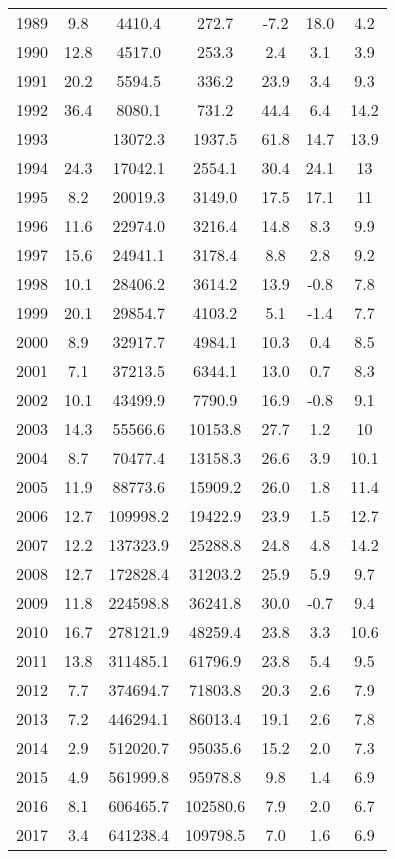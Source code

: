 \begin{table}[t]
\begin{tabularx}{\linewidth}{c S[table-format=2.1] *2{S[table-format=6.1]} *3{S[table-format=2.1]}}
  1989 & 9.8  & 4410.4   & 272.7    & -7.2 & 18.0 & 4.2  \\
  1990 & 12.8 & 4517.0   & 253.3    & 2.4  & 3.1  & 3.9  \\
  1991 & 20.2 & 5594.5   & 336.2    & 23.9 & 3.4  & 9.3  \\
  1992 & 36.4 & 8080.1   & 731.2    & 44.4 & 6.4  & 14.2 \\
  1993 &      & 13072.3  & 1937.5   & 61.8 & 14.7 & 13.9 \\
  1994 & 24.3 & 17042.1  & 2554.1   & 30.4 & 24.1 & 13   \\
  1995 & 8.2  & 20019.3  & 3149.0   & 17.5 & 17.1 & 11   \\
  1996 & 11.6 & 22974.0  & 3216.4   & 14.8 & 8.3  & 9.9  \\
  1997 & 15.6 & 24941.1  & 3178.4   & 8.8  & 2.8  & 9.2  \\
  1998 & 10.1 & 28406.2  & 3614.2   & 13.9 & -0.8 & 7.8  \\
  1999 & 20.1 & 29854.7  & 4103.2   & 5.1  & -1.4 & 7.7  \\
  2000 & 8.9  & 32917.7  & 4984.1   & 10.3 & 0.4  & 8.5  \\
  2001 & 7.1  & 37213.5  & 6344.1   & 13.0 & 0.7  & 8.3  \\
  2002 & 10.1 & 43499.9  & 7790.9   & 16.9 & -0.8 & 9.1  \\
  2003 & 14.3 & 55566.6  & 10153.8  & 27.7 & 1.2  & 10   \\
  2004 & 8.7  & 70477.4  & 13158.3  & 26.6 & 3.9  & 10.1 \\
  2005 & 11.9 & 88773.6  & 15909.2  & 26.0 & 1.8  & 11.4 \\
  2006 & 12.7 & 109998.2 & 19422.9  & 23.9 & 1.5  & 12.7 \\
  2007 & 12.2 & 137323.9 & 25288.8  & 24.8 & 4.8  & 14.2 \\
  2008 & 12.7 & 172828.4 & 31203.2  & 25.9 & 5.9  & 9.7  \\
  2009 & 11.8 & 224598.8 & 36241.8  & 30.0 & -0.7 & 9.4  \\
  2010 & 16.7 & 278121.9 & 48259.4  & 23.8 & 3.3  & 10.6 \\
  2011 & 13.8 & 311485.1 & 61796.9  & 23.8 & 5.4  & 9.5  \\
  2012 & 7.7  & 374694.7 & 71803.8  & 20.3 & 2.6  & 7.9  \\
  2013 & 7.2  & 446294.1 & 86013.4  & 19.1 & 2.6  & 7.8  \\
  2014 & 2.9  & 512020.7 & 95035.6  & 15.2 & 2.0  & 7.3  \\
  2015 & 4.9  & 561999.8 & 95978.8  & 9.8  & 1.4  & 6.9  \\
  2016 & 8.1  & 606465.7 & 102580.6 & 7.9  & 2.0  & 6.7  \\
  2017 & 3.4  & 641238.4 & 109798.5 & 7.0  & 1.6  & 6.9  \\
  \bottomrule
\end{tabularx}%
\end{table}
\restoregeometry
